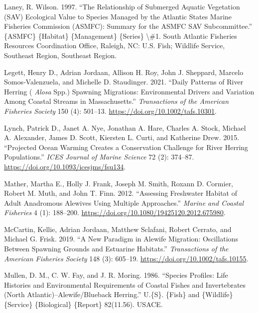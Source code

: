 \documentclass[
]{book}
\newlength{\cslhangindent}
\newlength{\cslentryspacingunit} %
\newenvironment{CSLReferences}[2] %
 {%
  \setlength{\parindent}{0pt}
  \ifodd #1
  \let\oldpar\par
  \def\par{\hangindent=\cslhangindent\oldpar}
  \fi
  \setlength{\parskip}{#2\cslentryspacingunit}
 }%
 {}
\begin{document}
\begin{CSLReferences}{1}{0}
\leavevmode{}%
Laney, R. Wilson. 1997. {``The {Relationship} of {Submerged} {Aquatic} {Vegetation} ({SAV}) {Ecological} {Value} to {Species} {Managed} by the {Atlantic} {States} {Marine} {Fisheries} {Commission} ({ASMFC}): {Summary} for the {ASMFC} {SAV} {Subcommittee}.''} \{ASMFC\} \{Habitat\} \{Management\} \{Series\} \textbackslash\#1. South Atlantic Fisheries Resources Coordination Office, Raleigh, NC: U.S. Fish; Wildlife Service, Southeast Region, Southeast Region.

\leavevmode{}%
Legett, Henry D., Adrian Jordaan, Allison H. Roy, John J. Sheppard, Marcelo Somos‐Valenzuela, and Michelle D. Staudinger. 2021. {``Daily {Patterns} of {River} {Herring} ( \emph{Alosa} Spp.) {Spawning} {Migrations}: {Environmental} {Drivers} and {Variation} Among {Coastal} {Streams} in {Massachusetts}.''} \emph{Transactions of the American Fisheries Society} 150 (4): 501--13. \url{https://doi.org/10.1002/tafs.10301}.

\leavevmode{}%
Lynch, Patrick D., Janet A. Nye, Jonathan A. Hare, Charles A. Stock, Michael A. Alexander, James D. Scott, Kiersten L. Curti, and Katherine Drew. 2015. {``Projected Ocean Warming Creates a Conservation Challenge for River Herring Populations.''} \emph{ICES Journal of Marine Science} 72 (2): 374--87. \url{https://doi.org/10.1093/icesjms/fsu134}.

\leavevmode{}%
Mather, Martha E., Holly J. Frank, Joseph M. Smith, Roxann D. Cormier, Robert M. Muth, and John T. Finn. 2012. {``Assessing {Freshwater} {Habitat} of {Adult} {Anadromous} {Alewives} {Using} {Multiple} {Approaches}.''} \emph{Marine and Coastal Fisheries} 4 (1): 188--200. \url{https://doi.org/10.1080/19425120.2012.675980}.

\leavevmode{}%
McCartin, Kellie, Adrian Jordaan, Matthew Sclafani, Robert Cerrato, and Michael G. Frisk. 2019. {``A {New} {Paradigm} in {Alewife} {Migration}: {Oscillations} Between {Spawning} {Grounds} and {Estuarine} {Habitats}.''} \emph{Transactions of the American Fisheries Society} 148 (3): 605--19. \url{https://doi.org/10.1002/tafs.10155}.

\leavevmode{}%
Mullen, D. M., C. W. Fay, and J. R. Moring. 1986. {``Species Profiles: Life Histories and Environmental Requirements of Coastal Fishes and Invertebrates ({North} {Atlantic})--Alewife/Blueback Herring.''} U.\{S\}. \{Fish\} and \{Wildlife\} \{Service\} \{Biological\} \{Report\} 82(11.56). USACE.


\end{CSLReferences}
\end{document}
